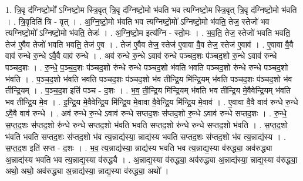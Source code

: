 \documentclass[17pt]{extarticle}
\begin{document}
1. त्रि॒वृ द॑ग्निष्टो॒मो᳚ ऽग्निष्टो॒म स्त्रि॒वृत् त्रि॒वृ द॑ग्निष्टो॒मो भ॑वति भव त्यग्निष्टो॒म स्त्रि॒वृत् त्रि॒वृ द॑ग्निष्टो॒मो भ॑वति । . त्रि॒वृदिति॑ त्रि - वृत् । . अ॒ग्नि॒ष्टो॒मो भ॑वति भव त्यग्निष्टो॒मो᳚ ऽग्निष्टो॒मो भ॑वति॒ तेज॒ स्तेजो॑ भव त्यग्निष्टो॒मो᳚ ऽग्निष्टो॒मो भ॑वति॒ तेजः॑ । . अ॒ग्नि॒ष्टो॒म इत्य॑ग्नि - स्तो॒मः । . भ॒व॒ति॒ तेज॒ स्तेजो॑ भवति भवति॒ तेज॑ ए॒वैव तेजो॑ भवति भवति॒ तेज॑ ए॒व । . तेज॑ ए॒वैव तेज॒ स्तेज॑ ए॒वावा वै॒व तेज॒ स्तेज॑ ए॒वाव॑ । . ए॒वावा वै॒वै वाव॑ रुन्धे रु॒न्धे ऽवै॒वै वाव॑ रुन्धे । . अव॑ रुन्धे रु॒न्धे ऽवाव॑ रुन्धे पञ्चद॒शः प॑ञ्चद॒शो रु॒न्धे ऽवाव॑ रुन्धे पञ्चद॒शः । . रु॒न्धे॒ प॒ञ्च॒द॒शः प॑ञ्चद॒शो रु॑न्धे रुन्धे पञ्चद॒शो भ॑वति भवति पञ्चद॒शो रु॑न्धे रुन्धे पञ्चद॒शो भ॑वति । . प॒ञ्च॒द॒शो भ॑वति भवति पञ्चद॒शः प॑ञ्चद॒शो भ॑व तीन्द्रि॒य मि॑न्द्रि॒यम् भ॑वति पञ्चद॒शः प॑ञ्चद॒शो भ॑व तीन्द्रि॒यम् । . प॒ञ्च॒द॒श इति॑ पञ्च - द॒शः । . भ॒व॒ ती॒न्द्रि॒य मि॑न्द्रि॒यम् भ॑वति भव तीन्द्रि॒य मे॒वैवेन्द्रि॒यम् भ॑वति भव तीन्द्रि॒य मे॒व । . इ॒न्द्रि॒य मे॒वैवेन्द्रि॒य मि॑न्द्रि॒य मे॒वावा वै॒वेन्द्रि॒य मि॑न्द्रि॒य मे॒वाव॑ । . ए॒वावा वै॒वै वाव॑ रुन्धे रु॒न्धे ऽवै॒वै वाव॑ रुन्धे । . अव॑ रुन्धे रु॒न्धे ऽवाव॑ रुन्धे सप्तद॒शः स॑प्तद॒शो रु॒न्धे ऽवाव॑ रुन्धे सप्तद॒शः । . रु॒न्धे॒ स॒प्त॒द॒शः स॑प्तद॒शो रु॑न्धे रुन्धे सप्तद॒शो भ॑वति भवति सप्तद॒शो रु॑न्धे रुन्धे सप्तद॒शो भ॑वति । . स॒प्त॒द॒शो भ॑वति भवति सप्तद॒शः स॑प्तद॒शो भ॑व त्य॒न्नाद्य॑स्या॒ न्नाद्य॑स्य भवति सप्तद॒शः स॑प्तद॒शो भ॑व त्य॒न्नाद्य॑स्य । . स॒प्त॒द॒श इति॑ सप्त - द॒शः । . भ॒व॒ त्य॒न्नाद्य॑स्या॒ न्नाद्य॑स्य भवति भव त्य॒न्नाद्य॒स्या व॑रुद्ध्या॒ अव॑रुद्ध्या अ॒न्नाद्य॑स्य भवति भव त्य॒न्नाद्य॒स्या व॑रुद्ध्यै । . अ॒न्नाद्य॒स्या व॑रुद्ध्या॒ अव॑रुद्ध्या अ॒न्नाद्य॑स्या॒ न्नाद्य॒स्या व॑रुद्ध्या॒ अथो॒ अथो॒ अव॑रुद्ध्या अ॒न्नाद्य॑स्या॒ न्नाद्य॒स्या व॑रुद्ध्या॒ अथो᳚ । \newline
\end{document}
